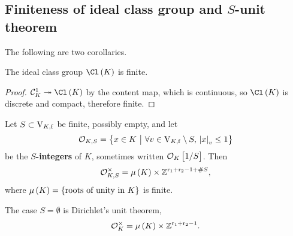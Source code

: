 \pagebreak

\subsection{Finiteness of ideal class group and \texorpdfstring{$ S $}{S}-unit theorem}

The following are two corollaries.

\begin{corollary}
The ideal class group $ \Cl\br{K} $ is finite.
\end{corollary}

\begin{proof}
$ \CCC_K^1 \twoheadrightarrow \Cl\br{K} $ by the content map, which is continuous, so $ \Cl\br{K} $ is discrete and compact, therefore finite.
\end{proof}

\begin{corollary}
\label{cor:6.7}
Let $ S \subset \mathrm{V}_{K, \mathrm{f}} $ be finite, possibly empty, and let
$$ \OOO_{K, S} = \cbr{x \in K \st \forall v \in \V_{K, \f} \setminus S, \ \abs{x}_v \le 1} $$
be the \textbf{$ S $-integers} of $ K $, sometimes written $ \OOO_K\sbr{1 / S} $. Then
$$ \OOO_{K, S}^\times = \mu\br{K} \times \ZZ^{\r_1 + \r_2 - 1 + \#S}, $$
where $ \mu\br{K} = \cbr{\text{roots of unity in} \ K} $ is finite.
\end{corollary}

The case $ S = \emptyset $ is Dirichlet's unit theorem,
$$ \OOO_K^\times = \mu\br{K} \times \ZZ^{\r_1 + \r_2 - 1}. $$

